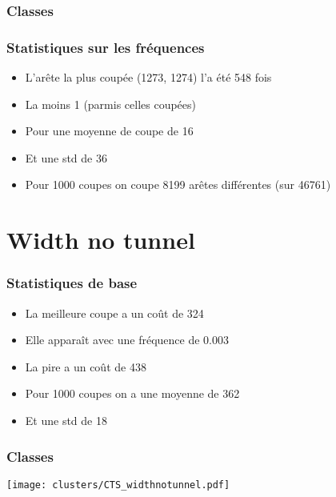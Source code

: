 \documentclass[aspectratio=169]{beamer}
\begin{document}
    \begin{frame}
        \frametitle{Classes}
    
        
    
    \end{frame}

    \begin{frame}
        \frametitle{Statistiques sur les fréquences}
        
        \begin{itemize}
            \item L'arête la plus coupée (1273, 1274) l'a été 548 fois
            \item La moins 1 (parmis celles coupées)
            \item Pour une moyenne de coupe de 16
            \item Et une std de 36
            \item Pour 1000 coupes on coupe 8199 arêtes différentes (sur 46761)
        \end{itemize}
    
    \end{frame}

    \section{Width no tunnel}
    \begin{frame}
        \frametitle{Statistiques de base}
        
        \begin{itemize}
            \item La meilleure coupe a un coût de 324
            \item Elle apparaît avec une fréquence de 0.003
            \item La pire a un coût de 438
            \item Pour 1000 coupes on a une moyenne de 362
            \item Et une std de 18
        \end{itemize}
    
    \end{frame}

    \begin{frame}
        \frametitle{Classes}
        \centering
        \texttt{[image: clusters/CTS\_widthnotunnel.pdf]}    
    \end{frame}
\end{document}
